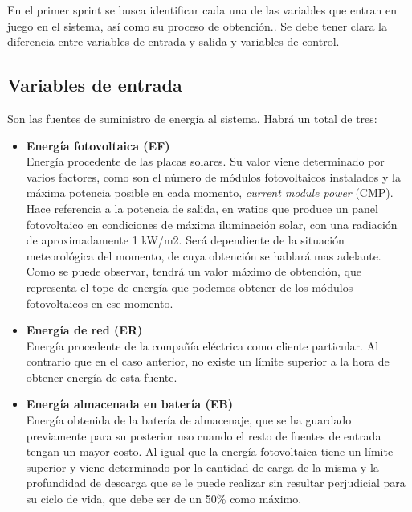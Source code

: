 En el primer sprint se busca identificar cada una de las variables que entran en juego en el sistema, así como su proceso de obtención.. Se debe tener clara la diferencia entre variables de entrada y salida y variables de control.
\subsection{Variables de entrada}
Son las fuentes de suministro de energía al sistema. Habrá un total de tres:
\begin{itemize}
	\item \textbf{Energía fotovoltaica (EF)}\\ Energía procedente de las placas solares. Su valor viene determinado por varios factores, como son el número de módulos fotovoltaicos instalados y la máxima potencia posible en cada momento, \textit{current module power} (CMP). Hace referencia a la potencia de salida, en watios que produce un panel fotovoltaico en condiciones de máxima iluminación solar, con una radiación de aproximadamente 1 kW/m2. Será dependiente de la situación meteorológica del momento, de cuya obtención se hablará mas adelante. Como se puede observar, tendrá un valor máximo de obtención, que representa el tope de energía que podemos obtener de los módulos fotovoltaicos en ese momento.
	\item \textbf{Energía de red (ER)}\\ Energía procedente de la compañía eléctrica como cliente particular. Al contrario que en el caso anterior, no existe un límite superior a la hora de obtener energía de esta fuente.
	\item \textbf{Energía almacenada en batería (EB)}\\ Energía obtenida de la batería de almacenaje, que se ha guardado previamente para su posterior uso cuando el resto de fuentes de entrada tengan un mayor costo. Al igual que la energía fotovoltaica tiene un límite superior y viene determinado por la cantidad de carga de la misma y la profundidad de descarga que se le puede realizar sin resultar perjudicial para su ciclo de vida, que debe ser de un 50\% como máximo.
\end{itemize}


